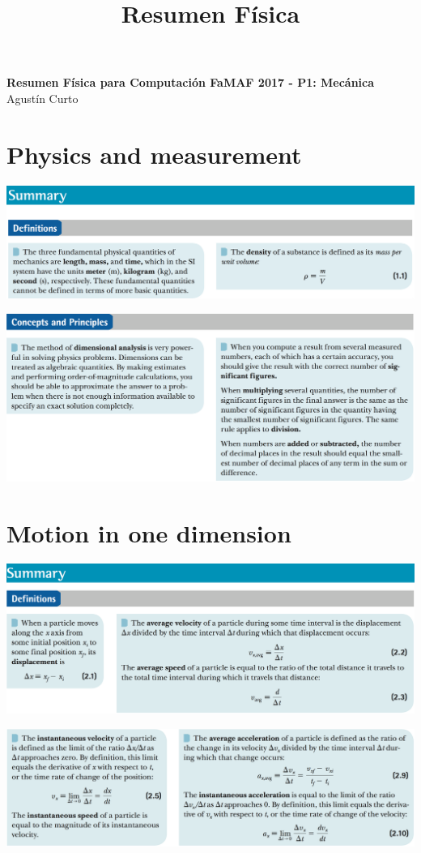 \documentclass[12pt,a4paper]{article}
\title{Resumen Física}
\newcommand{\N}{\noindent}
\begin{document}
	\begin{center}
		\Huge \textbf{Resumen Física para Computación FaMAF 2017 - P1: Mecánica} \\
		\vspace{3mm}
		\large Agustín Curto
	\end{center}

	\section{Physics and measurement}
		\N \includegraphics[scale=.42]{1_a.png}
		
		\vspace{2mm}
		\N \includegraphics[scale=.42]{1_b.png}
		
	\section{Motion in one dimension}
		\N \includegraphics[scale=.42]{2_a.png}
		
		\vspace{2mm}
		\N \includegraphics[scale=.42]{2_b.png}
		
\end{document}
